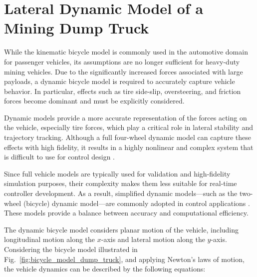 \documentclass[letterpaper]{ifacconf}
\begin{document}
\section{Lateral Dynamic Model of a Mining Dump Truck}

While the kinematic bicycle model is commonly used in the automotive domain for passenger vehicles, its assumptions are no longer sufficient for heavy-duty mining vehicles. Due to the significantly increased forces associated with large payloads, a dynamic bicycle model is required to accurately capture vehicle behavior. In particular, effects such as tire side-slip, oversteering, and friction forces become dominant and must be explicitly considered.

Dynamic models provide a more accurate representation of the forces acting on the vehicle, especially tire forces, which play a critical role in lateral stability and trajectory tracking. Although a full four-wheel dynamic model can capture these effects with high fidelity, it results in a highly nonlinear and complex system that is difficult to use for control design \cite{refFullVehicleModel}.

Since full vehicle models are typically used for validation and high-fidelity simulation purposes, their complexity makes them less suitable for real-time controller development. As a result, simplified dynamic models—such as the two-wheel (bicycle) dynamic model—are commonly adopted in control applications \cite{refVehicleControlReview}. These models provide a balance between accuracy and computational efficiency.

The dynamic bicycle model considers planar motion of the vehicle, including longitudinal motion along the $x$-axis and lateral motion along the $y$-axis. Considering the bicycle model illustrated in Fig.~\ref{fig:bicycle_model_dump_truck}, and applying Newton’s laws of motion, the vehicle dynamics can be described by the following equations:



\end{document}
